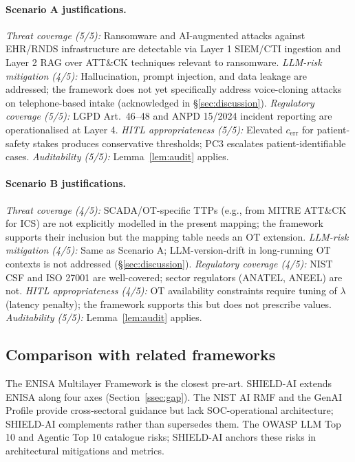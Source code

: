 \documentclass[preprint,12pt,authoryear]{elsarticle}
\begin{document}
\paragraph{Scenario A justifications.}
\emph{Threat coverage (5/5):} Ransomware and AI-augmented attacks against EHR/RNDS infrastructure are detectable via Layer 1 SIEM/CTI ingestion and Layer 2 RAG over ATT\&CK techniques relevant to ransomware. \emph{LLM-risk mitigation (4/5):} Hallucination, prompt injection, and data leakage are addressed; the framework does not yet specifically address voice-cloning attacks on telephone-based intake (acknowledged in §\ref{sec:discussion}). \emph{Regulatory coverage (5/5):} LGPD Art.~46--48 and ANPD 15/2024 incident reporting are operationalised at Layer 4. \emph{HITL appropriateness (5/5):} Elevated $c_{\text{err}}$ for patient-safety stakes produces conservative thresholds; PC3 escalates patient-identifiable cases. \emph{Auditability (5/5):} Lemma~\ref{lem:audit} applies.

\paragraph{Scenario B justifications.}
\emph{Threat coverage (4/5):} SCADA/OT-specific TTPs (e.g., from MITRE ATT\&CK for ICS) are not explicitly modelled in the present mapping; the framework supports their inclusion but the mapping table needs an OT extension. \emph{LLM-risk mitigation (4/5):} Same as Scenario A; LLM-version-drift in long-running OT contexts is not addressed (§\ref{sec:discussion}). \emph{Regulatory coverage (4/5):} NIST CSF and ISO 27001 are well-covered; sector regulators (ANATEL, ANEEL) are not. \emph{HITL appropriateness (4/5):} OT availability constraints require tuning of $\lambda$ (latency penalty); the framework supports this but does not prescribe values. \emph{Auditability (5/5):} Lemma~\ref{lem:audit} applies.

\subsection{Comparison with related frameworks}
The ENISA Multilayer Framework \citep{enisa2023multilayer} is the closest pre-art. SHIELD-AI extends ENISA along four axes (Section~\ref{ssec:gap}). The NIST AI RMF \citep{nist2023airmf} and the GenAI Profile \citep{nist2024genai} provide cross-sectoral guidance but lack SOC-operational architecture; SHIELD-AI complements rather than supersedes them. The OWASP LLM Top 10 \citep{owasp2025llm} and Agentic Top 10 \citep{owasp2025agentic} catalogue risks; SHIELD-AI anchors these risks in architectural mitigations and metrics.
\end{document}
